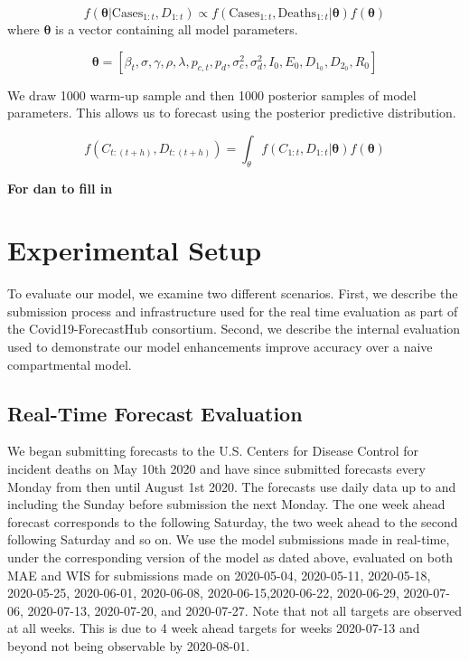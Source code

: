 \documentclass[11pt]{amsart}
\begin{document}
\begin{equation}
f(\bm{\theta} | \text{Cases}_{1:t},D_{1:t}) \propto f(\text{Cases}_{1:t},\text{Deaths}_{1:t} | \bm{\theta})f(\bm{\theta})
\end{equation}
where $\bm{\theta}$ is a vector containing all model parameters. 

\begin{equation}
\bm{\theta} =[\beta_{t} ,
\sigma ,
\gamma ,
\rho ,
\lambda ,
p_{c,t} ,
p_{d} ,
\sigma_c^2 ,
\sigma_d^2 ,
I_0 ,
E_0 ,
D_{1_0} ,
D_{2_0} ,
R_0 ]
\end{equation}

We draw 1000 warm-up sample and then 1000 posterior samples of model parameters. This allows us to forecast using the posterior predictive distribution.

\begin{equation}
f(C_{t:(t+h)}, D_{t:(t+h)}) =  \int_{\theta} f(C_{1:t},D_{1:t} | \bm{\theta})f(\bm{\theta})
\end{equation}

\textbf{For dan to fill in}
 \section{Experimental Setup}
 To evaluate our model, we examine two different scenarios. First, we describe the submission process and infrastructure used for the real time evaluation as part of the Covid19-ForecastHub consortium. Second, we describe the internal evaluation used to demonstrate our model enhancements improve accuracy over a naive compartmental model. 
 
 \subsection{Real-Time Forecast Evaluation}
We began submitting forecasts to the U.S. Centers for Disease Control for incident deaths on May 10th 2020 and have since submitted forecasts every Monday from then until August 1st 2020. The forecasts use daily data up to and including the Sunday before submission the next Monday. The one week ahead forecast corresponds to the following Saturday, the two week ahead to the second following Saturday and so on.  We use the model submissions made in real-time, under the corresponding version of the model as dated above, evaluated on both MAE and WIS for submissions made on 2020-05-04, 2020-05-11, 2020-05-18, 2020-05-25, 2020-06-01, 2020-06-08, 2020-06-15,2020-06-22, 2020-06-29, 2020-07-06, 2020-07-13, 2020-07-20, and 2020-07-27. Note that not all targets are observed at all weeks. This is due to 4 week ahead targets for weeks 2020-07-13 and beyond not being observable by 2020-08-01.
 
\end{document}
